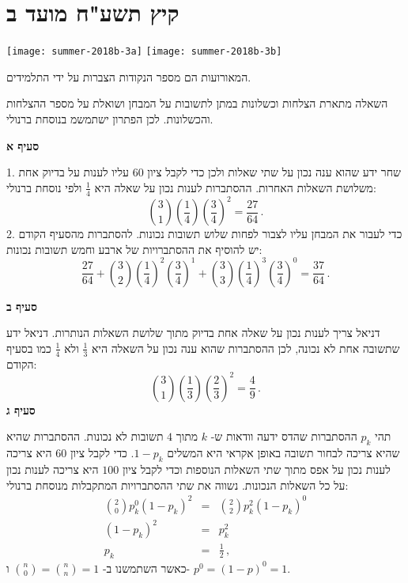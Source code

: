 


\section{קיץ תשע"ח מועד ב}

\begin{center}
\hspace*{8em}\texttt{[image: summer-2018b-3a]}
\hspace*{-2.2em}\texttt{[image: summer-2018b-3b]}
\end{center}

המאורועות הם מספר הנקודות הצברות על ידי התלמידים.

השאלה מתארת הצלחות וכשלונות במתן לתשובות על המבחן ושואלת על מספר ההצלחות והכשלונות. לכן הפתרון ישתמשמ בנוסחת ברנולי.

\textbf{סעיף א}

1. שחר ידע שהוא ענה נכון על שתי שאלות ולכן כדי לקבל ציון
$60$
עליו לענות על בדיוק אחת משלושת השאלות האחרות. ההסתברות לענות נכון על שאלה היא 
$\frac{1}{4}$
ולפי נוסחת ברנולי:
\[
{3 \choose 1}\left(\frac{1}{4}\right)\left(\frac{3}{4}\right)^2=\frac{27}{64}\,.
\]
2. כדי לעבור את המבחן עליו לצבור לפחות שלוש תשובות נכונות. להסתברות מהסעיף הקודם יש להוסיף את ההסתברויות של ארבע וחמש תשובות נכונות:
\[
\frac{27}{64}+{3 \choose 2}\left(\frac{1}{4}\right)^2\left(\frac{3}{4}\right)^1+{3 \choose 3}\left(\frac{1}{4}\right)^3\left(\frac{3}{4}\right)^0=\frac{37}{64}\,.
\]

\newpage

\textbf{סעיף ב}

דניאל צריך לענות נכון על שאלה אחת בדיוק מתוך שלושת השאלות הנותרות. דניאל ידע שתשובה אחת לא נכונה, לכן ההסתברות שהוא ענה נכון על השאלה היא
$\frac{1}{3}$
ולא 
$\frac{1}{4}$
כמו בסעיף הקודם:
\[
{3 \choose 1}\left(\frac{1}{3}\right)\left(\frac{2}{3}\right)^2=\frac{4}{9}\,.
\]
\textbf{סעיף ג}

תהי
$p_k$
ההסתברות שהדס ידעה וודאות ש-%
$k$
מתוך 
$4$
תשובות לא נכונות. ההסתברות שהיא שהיא צריכה לבחור תשובה באופן אקראי היא המשלים
$1-p_k$.
כדי לקבל ציון
$60$
היא צריכה לענות נכון על אפס מתוך שתי השאלות הנוספות וכדי לקבל ציון 
$100$
היא צריכה לענות נכון על כל השאלות הנכונות. נשווה את שתי ההסתברויות המתקבלות מנוסחת ברנולי:
\begin{eqnarray*}
{2 \choose 0}p_k^0(1-p_k)^2 &=& {2 \choose 2}p_k^2(1-p_k)^0\\
(1-p_k)^2 &=& p_k^2\\
p_k&=&\frac{1}{2}\,,
\end{eqnarray*}
כאשר השתמשנו ב-%
${n\choose 0}={n\choose n}=1$
ו-%
$p^0=(1-p)^0=1$.

